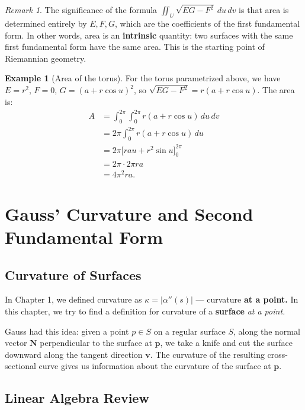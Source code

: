 \documentclass[10pt, a4paper]{article}
\theoremstyle{plain}
\theoremstyle{definition}
\newtheorem{example}[theorem]{Example}
\theoremstyle{remark}
\newtheorem{remark}[theorem]{Remark}
\begin{document}
\begin{remark}
  The significance of the formula $\iint_U \sqrt{EG-F^2}\,du\,dv$ is that area
  is determined entirely by $E, F, G$, which are the coefficients of the first
  fundamental form. In other words, area is an \textbf{intrinsic} quantity: two
  surfaces with the same first fundamental form have the same area. This is the
  starting point of Riemannian geometry.
\end{remark}

\begin{example}[Area of the torus]
  For the torus parametrized above, we have $E = r^2$, $F = 0$,
  $G = (a + r\cos u)^2$, so $\sqrt{EG - F^2} = r(a + r\cos u)$. The area is:
  \begin{align*}
    A
    &= \int_0^{2\pi}\int_0^{2\pi} r(a + r\cos u)\, du\, dv \\
    &= 2\pi \int_0^{2\pi} r(a + r\cos u)\, du \\
    &= 2\pi \Big[rau + r^2\sin u\Big]_0^{2\pi} \\
    &= 2\pi \cdot 2\pi ra \\
    &= 4\pi^2 ra.
  \end{align*}
\end{example}
\section{Gauss' Curvature and Second Fundamental Form}


\pagebreak
\subsection{Curvature of Surfaces}

In Chapter 1, we defined curvature as $\kappa = |\alpha''(s)|$ --- curvature \textbf{at a point.}
In this chapter, we try to find a definition for curvature of a \textbf{surface} \emph{at a point.}

Gauss had this idea: given a point $p \in S$ on a regular surface $S$, along the normal vector
$\mathbf{N}$ perpendicular to the surface at $\mathbf{p}$, we take a knife and cut the surface
downward along the tangent direction $\mathbf{v}$. The curvature of the resulting cross-sectional
curve gives us information about the curvature of the surface at $\mathbf{p}$.

\subsection{Linear Algebra Review}
\end{document}
